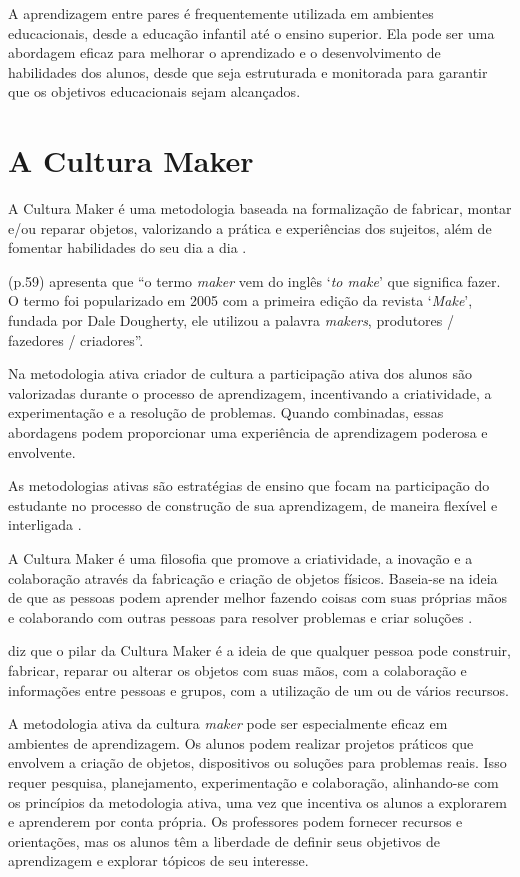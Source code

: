 A aprendizagem entre pares é frequentemente utilizada em ambientes educacionais, desde a educação infantil até o ensino superior. Ela pode ser uma abordagem eficaz para melhorar o aprendizado e o desenvolvimento de habilidades dos alunos, desde que seja estruturada e monitorada para garantir que os objetivos educacionais sejam alcançados.

\section{A Cultura Maker}

A Cultura Maker é uma metodologia baseada na formalização de fabricar, montar e/ou reparar objetos, valorizando a prática e experiências dos sujeitos, além de fomentar habilidades do seu dia a dia \cite{PAULA2019}.

 (p.59) apresenta que ``o termo \textit{maker} vem do inglês `\textit{to make}' que significa fazer. O termo foi popularizado em 2005 com a primeira edição da revista `\textit{Make}', fundada por Dale Dougherty, ele utilizou a palavra \textit{makers}, produtores / fazedores / criadores''.

Na metodologia ativa criador de cultura a participação ativa dos alunos são valorizadas durante o processo de aprendizagem, incentivando a criatividade, a experimentação e a resolução de problemas. Quando combinadas, essas abordagens podem proporcionar uma experiência de aprendizagem poderosa e envolvente.

As metodologias ativas são estratégias de ensino que focam na participação do estudante no processo de construção de sua aprendizagem, de maneira flexível e interligada \cite{BACICHMORAN2018}.

A Cultura Maker é uma filosofia que promove a criatividade, a inovação e a colaboração através da fabricação e criação de objetos físicos. Baseia-se na ideia de que as pessoas podem aprender melhor fazendo coisas com suas próprias mãos e colaborando com outras pessoas para resolver problemas e criar soluções \cite{CABRAL2021}.

 diz que o pilar da Cultura Maker é a ideia de que qualquer pessoa pode construir, fabricar, reparar ou alterar os objetos com suas mãos, com a colaboração e informações entre pessoas e grupos, com a utilização de um ou de vários recursos.

A metodologia ativa da cultura \textit{maker} pode ser especialmente eficaz em ambientes de aprendizagem. Os alunos podem realizar projetos práticos que envolvem a criação de objetos, dispositivos ou soluções para problemas reais. Isso requer pesquisa, planejamento, experimentação e colaboração, alinhando-se com os princípios da metodologia ativa, uma vez que incentiva os alunos a explorarem e aprenderem por conta própria. Os professores podem fornecer recursos e orientações, mas os alunos têm a liberdade de definir seus objetivos de aprendizagem e explorar tópicos de seu interesse.

